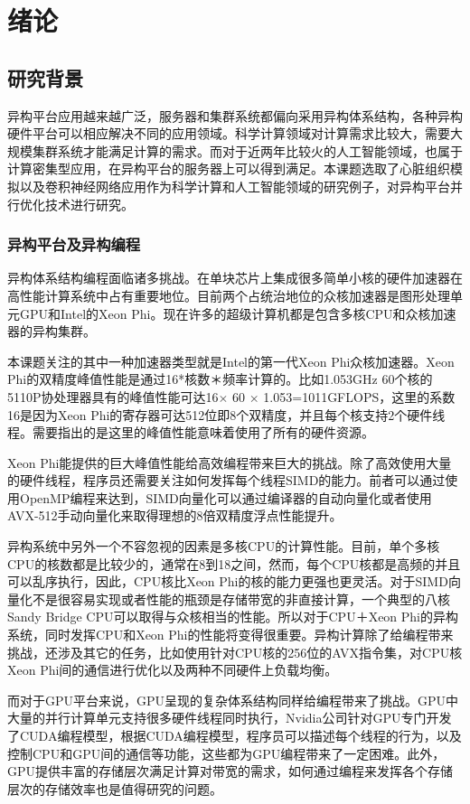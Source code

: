 \chapter{绪论}

\section{研究背景}
异构平台应用越来越广泛，服务器和集群系统都偏向采用异构体系结构，各种异构硬件平台可以相应解决不同的应用领域。科学计算领域对计算需求比较大，需要大规模集群系统才能满足计算的需求。而对于近两年比较火的人工智能领域，也属于计算密集型应用，在异构平台的服务器上可以得到满足。本课题选取了心脏组织模拟以及卷积神经网络应用作为科学计算和人工智能领域的研究例子，对异构平台并行优化技术进行研究。

\subsection{异构平台及异构编程}
异构体系结构编程面临诸多挑战。在单块芯片上集成很多简单小核的硬件加速器在高性能计算系统中占有重要地位。目前两个占统治地位的众核加速器是图形处理单元GPU和Intel的Xeon Phi。现在许多的超级计算机都是包含多核CPU和众核加速器的异构集群。

本课题关注的其中一种加速器类型就是Intel的第一代Xeon Phi众核加速器。Xeon Phi的双精度峰值性能是通过16*核数＊频率计算的。比如1.053GHz 60个核的5110P协处理器具有的峰值性能可达16$\times$ 60 $\times$ 1.053=1011GFLOPS，这里的系数16是因为Xeon Phi的寄存器可达512位即8个双精度，并且每个核支持2个硬件线程。需要指出的是这里的峰值性能意味着使用了所有的硬件资源。

Xeon Phi能提供的巨大峰值性能给高效编程带来巨大的挑战。除了高效使用大量的硬件线程，程序员还需要关注如何发挥每个线程SIMD的能力。前者可以通过使用OpenMP编程来达到，SIMD向量化可以通过编译器的自动向量化或者使用AVX-512手动向量化来取得理想的8倍双精度浮点性能提升。

异构系统中另外一个不容忽视的因素是多核CPU的计算性能。目前，单个多核CPU的核数都是比较少的，通常在8到18之间，然而，每个CPU核都是高频的并且可以乱序执行，因此，CPU核比Xeon Phi的核的能力更强也更灵活。对于SIMD向量化不是很容易实现或者性能的瓶颈是存储带宽的非直接计算，一个典型的八核Sandy Bridge CPU可以取得与众核相当的性能。所以对于CPU＋Xeon Phi的异构系统，同时发挥CPU和Xeon Phi的性能将变得很重要。异构计算除了给编程带来挑战，还涉及其它的任务，比如使用针对CPU核的256位的AVX指令集，对CPU核Xeon Phi间的通信进行优化以及两种不同硬件上负载均衡。

而对于GPU平台来说，GPU呈现的复杂体系结构同样给编程带来了挑战。GPU中大量的并行计算单元支持很多硬件线程同时执行，Nvidia公司针对GPU专门开发了CUDA编程模型，根据CUDA编程模型，程序员可以描述每个线程的行为，以及控制CPU和GPU间的通信等功能，这些都为GPU编程带来了一定困难。此外，GPU提供丰富的存储层次满足计算对带宽的需求，如何通过编程来发挥各个存储层次的存储效率也是值得研究的问题。

